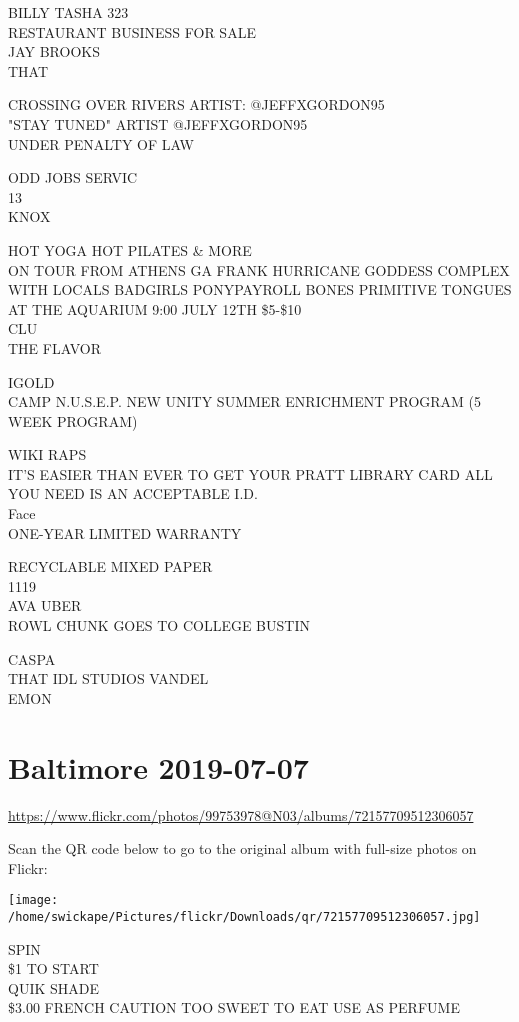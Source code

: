 \documentclass[10pt,letterpaper]{article}
\begin{document}
BILLY TASHA 323\\
RESTAURANT BUSINESS FOR SALE\\
JAY BROOKS\\
THAT

CROSSING OVER RIVERS ARTIST: @JEFFXGORDON95\\
"STAY TUNED" ARTIST @JEFFXGORDON95\\
UNDER PENALTY OF LAW

ODD JOBS SERVIC\\
13\\
KNOX

HOT YOGA HOT PILATES \& MORE\\
ON TOUR FROM ATHENS GA FRANK HURRICANE GODDESS COMPLEX WITH LOCALS BADGIRLS PONYPAYROLL BONES PRIMITIVE TONGUES AT THE AQUARIUM 9:00 JULY 12TH \$5{-}\$10\\
CLU\\
THE FLAVOR

IGOLD\\
CAMP N.U.S.E.P. NEW UNITY SUMMER ENRICHMENT PROGRAM (5 WEEK PROGRAM)

WIKI RAPS\\
IT'S EASIER THAN EVER TO GET YOUR PRATT LIBRARY CARD ALL YOU NEED IS AN ACCEPTABLE I.D.\\
Face\\
ONE{-}YEAR LIMITED WARRANTY

RECYCLABLE MIXED PAPER\\
1119\\
AVA UBER\\
ROWL CHUNK GOES TO COLLEGE BUSTIN

CASPA\\
THAT IDL STUDIOS VANDEL\\
EMON


\section*{Baltimore 2019-07-07}

\url{https://www.flickr.com/photos/99753978@N03/albums/72157709512306057}

Scan the QR code below to go to the original album with full-size photos on Flickr:

\texttt{[image: /home/swickape/Pictures/flickr/Downloads/qr/72157709512306057.jpg]}


SPIN\\
\$1 TO START\\
QUIK SHADE\\
\$3.00 FRENCH CAUTION TOO SWEET TO EAT USE AS PERFUME
\end{document}
